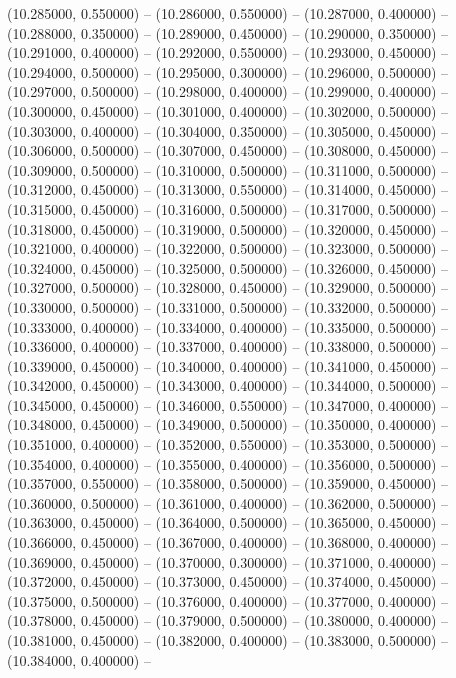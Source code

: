 (10.285000, 0.550000) -- 
(10.286000, 0.550000) -- 
(10.287000, 0.400000) -- 
(10.288000, 0.350000) -- 
(10.289000, 0.450000) -- 
(10.290000, 0.350000) -- 
(10.291000, 0.400000) -- 
(10.292000, 0.550000) -- 
(10.293000, 0.450000) -- 
(10.294000, 0.500000) -- 
(10.295000, 0.300000) -- 
(10.296000, 0.500000) -- 
(10.297000, 0.500000) -- 
(10.298000, 0.400000) -- 
(10.299000, 0.400000) -- 
(10.300000, 0.450000) -- 
(10.301000, 0.400000) -- 
(10.302000, 0.500000) -- 
(10.303000, 0.400000) -- 
(10.304000, 0.350000) -- 
(10.305000, 0.450000) -- 
(10.306000, 0.500000) -- 
(10.307000, 0.450000) -- 
(10.308000, 0.450000) -- 
(10.309000, 0.500000) -- 
(10.310000, 0.500000) -- 
(10.311000, 0.500000) -- 
(10.312000, 0.450000) -- 
(10.313000, 0.550000) -- 
(10.314000, 0.450000) -- 
(10.315000, 0.450000) -- 
(10.316000, 0.500000) -- 
(10.317000, 0.500000) -- 
(10.318000, 0.450000) -- 
(10.319000, 0.500000) -- 
(10.320000, 0.450000) -- 
(10.321000, 0.400000) -- 
(10.322000, 0.500000) -- 
(10.323000, 0.500000) -- 
(10.324000, 0.450000) -- 
(10.325000, 0.500000) -- 
(10.326000, 0.450000) -- 
(10.327000, 0.500000) -- 
(10.328000, 0.450000) -- 
(10.329000, 0.500000) -- 
(10.330000, 0.500000) -- 
(10.331000, 0.500000) -- 
(10.332000, 0.500000) -- 
(10.333000, 0.400000) -- 
(10.334000, 0.400000) -- 
(10.335000, 0.500000) -- 
(10.336000, 0.400000) -- 
(10.337000, 0.400000) -- 
(10.338000, 0.500000) -- 
(10.339000, 0.450000) -- 
(10.340000, 0.400000) -- 
(10.341000, 0.450000) -- 
(10.342000, 0.450000) -- 
(10.343000, 0.400000) -- 
(10.344000, 0.500000) -- 
(10.345000, 0.450000) -- 
(10.346000, 0.550000) -- 
(10.347000, 0.400000) -- 
(10.348000, 0.450000) -- 
(10.349000, 0.500000) -- 
(10.350000, 0.400000) -- 
(10.351000, 0.400000) -- 
(10.352000, 0.550000) -- 
(10.353000, 0.500000) -- 
(10.354000, 0.400000) -- 
(10.355000, 0.400000) -- 
(10.356000, 0.500000) -- 
(10.357000, 0.550000) -- 
(10.358000, 0.500000) -- 
(10.359000, 0.450000) -- 
(10.360000, 0.500000) -- 
(10.361000, 0.400000) -- 
(10.362000, 0.500000) -- 
(10.363000, 0.450000) -- 
(10.364000, 0.500000) -- 
(10.365000, 0.450000) -- 
(10.366000, 0.450000) -- 
(10.367000, 0.400000) -- 
(10.368000, 0.400000) -- 
(10.369000, 0.450000) -- 
(10.370000, 0.300000) -- 
(10.371000, 0.400000) -- 
(10.372000, 0.450000) -- 
(10.373000, 0.450000) -- 
(10.374000, 0.450000) -- 
(10.375000, 0.500000) -- 
(10.376000, 0.400000) -- 
(10.377000, 0.400000) -- 
(10.378000, 0.450000) -- 
(10.379000, 0.500000) -- 
(10.380000, 0.400000) -- 
(10.381000, 0.450000) -- 
(10.382000, 0.400000) -- 
(10.383000, 0.500000) -- 
(10.384000, 0.400000) -- 

